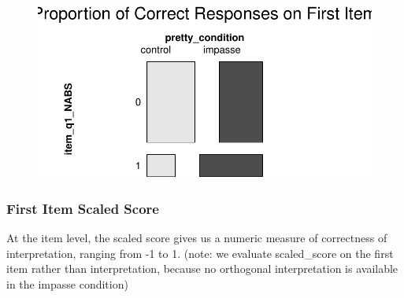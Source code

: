 \documentclass[
  letterpaper,
  DIV=11,
  numbers=noendperiod]{scrreprt}
\begin{document}
\begin{figure}[H]

{\centering \includegraphics{analysis/SGC3A/3_sgc3A_description_files/figure-pdf/VIS-FIRST-ABSOLUTE-3.pdf}

}

\end{figure}

\hypertarget{first-item-scaled-score}{%
\subsubsection{First Item Scaled Score}\label{first-item-scaled-score}}

At the item level, the scaled score gives us a numeric measure of
correctness of interpretation, ranging from -1 to 1. (note: we evaluate
scaled\_score on the first item rather than interpretation, because no
orthogonal interpretation is available in the impasse condition)
\end{document}
